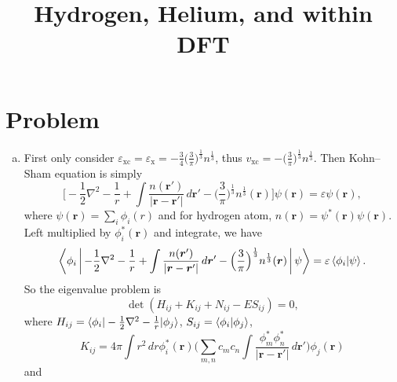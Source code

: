 \documentclass[12pt]{article}
\title{Hydrogen, Helium, and \ce{H2} within DFT}		%
\author{}								%
\date{}											%
\newcommand*{\RMN}[1]{\uppercase\expandafter{\romannumeral#1}}
\begin{document}

\section{Problem \RMN{1}}
\begin{enumerate}[(a)]
    \item First only consider $\varepsilon_{\text{xc}}=\varepsilon_{\text{x}}
          =-\frac{3}{4} \big( \frac{3}{\pi} \big)^{\frac{1}{3}} n^{ \frac{1}{3} }$,
          thus $v_{\text{xc}} = - \big( \frac{3}{\pi} \big)^{\frac{1}{3}}%
          n^{\frac{1}{3}}$.
          Then Kohn--Sham equation is simply
          \begin{equation}
              \bigg[- \frac{1}{2} \nabla^2 - \frac{1}{r} +
              \int \frac{n(\bm{r}')}{\lvert \bm{r} - \bm{r}' \rvert} \, d\bm{r}'
              - \Big( \frac{3}{\pi}\Big)^{\frac{1}{3}} n^{\frac{1}{3}}(\bm{r})
              \bigg]
              \psi(\bm{r}) = \varepsilon \psi(\bm{r}),
          \end{equation}
          where $\psi(\bm{r}) = \sum_{i} \phi_i(r)$
          and for hydrogen atom, $n(\bm{r}) = \psi^\ast(\bm{r}) \psi(\bm{r})$.
          Left multiplied by $\phi_i^\ast(\bm{r})$ and integrate, we have
          \begin{equation}
              \Braket{\phi_i |
                  - \frac{1}{2} \nabla^2 - \frac{1}{r} +
                  \int \frac{n(\bm{r}')}{\lvert \bm{r} - \bm{r}' \rvert} \, d\bm{r}'
                  - \Big( \frac{3}{\pi}\Big)^{\frac{1}{3}} n^{\frac{1}{3}}(\bm{r})
                  | \psi } = \varepsilon \braket{\phi_i | \psi}.
          \end{equation}
          So the eigenvalue problem is
          \begin{equation}
              \det (H_{ij} + K_{ij} + N_{ij} - E S_{ij}) = 0,
          \end{equation}
          where $H_{ij} = \braket{\phi_i | - \frac{1}{2}\nabla^2 - \frac{1}{r} | \phi_j}$, $S_{ij} =
          \braket{\phi_i | \phi_j}$,
          \begin{equation}
              K_{ij} = 4\pi \int r^2 \, d r \phi_i^\ast ( \bm{r} )
              \Big(  \sum_{m, n} c_m c_n
              \int  \frac{ \phi_m^\ast  \phi_n^\ast }{ \lvert \bm{r} - \bm{r}' \rvert }\, d \bm{r}' \Big)
              \phi_j ( \bm{r} )
          \end{equation}
          and
          \begin{equation}

\end{equation}
\end{enumerate}
\end{document}
